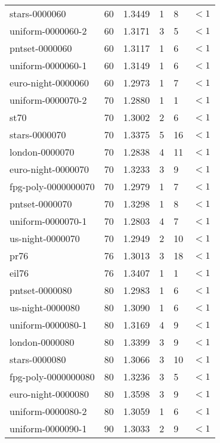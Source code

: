 \begin{longtable}{|lrrlll|}
stars-0000060 & 60 & \num{1.3449} & \num{1} & \num{8} & $<1$ \\
uniform-0000060-2 & 60 & \num{1.3171} & \num{3} & \num{5} & $<1$ \\
pntset-0000060 & 60 & \num{1.3117} & \num{1} & \num{6} & $<1$ \\
uniform-0000060-1 & 60 & \num{1.3149} & \num{1} & \num{6} & $<1$ \\
euro-night-0000060 & 60 & \num{1.2973} & \num{1} & \num{7} & $<1$ \\
uniform-0000070-2 & 70 & \num{1.2880} & \num{1} & \num{1} & $<1$ \\
st70 & 70 & \num{1.3002} & \num{2} & \num{6} & $<1$ \\
stars-0000070 & 70 & \num{1.3375} & \num{5} & \num{16} & $<1$ \\
london-0000070 & 70 & \num{1.2838} & \num{4} & \num{11} & $<1$ \\
euro-night-0000070 & 70 & \num{1.3233} & \num{3} & \num{9} & $<1$ \\
fpg-poly-0000000070 & 70 & \num{1.2979} & \num{1} & \num{7} & $<1$ \\
pntset-0000070 & 70 & \num{1.3298} & \num{1} & \num{8} & $<1$ \\
uniform-0000070-1 & 70 & \num{1.2803} & \num{4} & \num{7} & $<1$ \\
us-night-0000070 & 70 & \num{1.2949} & \num{2} & \num{10} & $<1$ \\
pr76 & 76 & \num{1.3013} & \num{3} & \num{18} & $<1$ \\
eil76 & 76 & \num{1.3407} & \num{1} & \num{1} & $<1$ \\
pntset-0000080 & 80 & \num{1.2983} & \num{1} & \num{6} & $<1$ \\
us-night-0000080 & 80 & \num{1.3090} & \num{1} & \num{6} & $<1$ \\
uniform-0000080-1 & 80 & \num{1.3169} & \num{4} & \num{9} & $<1$ \\
london-0000080 & 80 & \num{1.3399} & \num{3} & \num{9} & $<1$ \\
stars-0000080 & 80 & \num{1.3066} & \num{3} & \num{10} & $<1$ \\
fpg-poly-0000000080 & 80 & \num{1.3236} & \num{3} & \num{5} & $<1$ \\
euro-night-0000080 & 80 & \num{1.3598} & \num{3} & \num{9} & $<1$ \\
uniform-0000080-2 & 80 & \num{1.3059} & \num{1} & \num{6} & $<1$ \\
uniform-0000090-1 & 90 & \num{1.3033} & \num{2} & \num{9} & $<1$ \\

\end{longtable}
